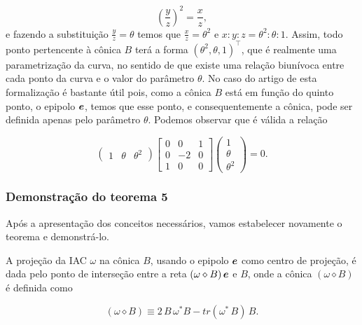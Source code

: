 \begin{equation*}
\left(\frac{y}{z}\right)^2=\frac{x}{z},
\end{equation*}
e fazendo a substituição $\displaystyle{\frac{y}{z}=\theta}$ temos que $\displaystyle{\frac{x}{z}=\theta^2}$ e $x:y:z=\theta^2:\theta:1$.
Assim, todo ponto pertencente à cônica $B$ terá a forma $(\theta^2,\theta,1)^\top$, que é realmente uma parametrização da curva, no sentido de que existe uma relação biunívoca entre cada ponto da curva e o valor do parâmetro $\theta$. No caso do artigo de \citep{2503343} esta formalização é bastante útil pois, como a cônica $B$ está em função do quinto ponto, o epipolo $\boldsymbol{e}$, temos que esse ponto, e consequentemente a cônica, pode ser definida apenas pelo parâmetro $\theta$. Podemos observar que é válida a relação

\begin{equation*}
\begin{pmatrix}
1&\theta&\theta^2
\end{pmatrix}
\begin{bmatrix}
0&0&1\\
0&-2&0\\
1&0&0
\end{bmatrix}
\begin{pmatrix}
1\\
\theta\\
\theta^2
\end{pmatrix}
=0.
\end{equation*}


\subsubsection{Demonstração do teorema 5}

Após a apresentação dos conceitos necessários, vamos estabelecer novamente o teorema e demonstrá-lo.

\begin{teorema}
A projeção da IAC $\omega$ na cônica $B$, usando o epipolo $\boldsymbol{e}$ como centro de projeção, é dada pelo ponto de interseção entre a reta $(\omega\diamond B)\,\boldsymbol{e}$ e $B$, onde a cônica $(\omega\diamond B)$ é definida como

\begin{equation}\label{eq.conica-diamond}
(\omega \diamond B)\equiv 2\,B\,\omega^*B - tr(\omega^*\,B)\,B.
\end{equation}
\end{teorema}

